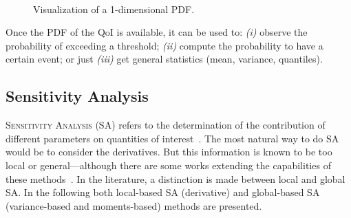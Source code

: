 \begin{figure}[!h]               
\centering
{}
 ~       
\caption{Visualization of a 1-dimensional PDF.}
\label{fig:ex_pdf}
\end{figure}

Once the PDF of the QoI is available, it can be used to: \emph{(i)} observe the probability of exceeding a threshold; \emph{(ii)} compute the probability to have a certain event; or just \emph{(iii)} get general statistics (mean, variance, quantiles).

\subsection{Sensitivity Analysis}\label{sec:sa}
\lettrine{S}{ensitivity Analysis} (SA) refers to the determination of the contribution of different parameters on quantities of interest~\cite{saltelli2007,iooss2016}. The most natural way to do SA would be to consider the derivatives. But this information is known to be too local or general---although there are some works extending the capabilities of these methods~\cite{kucherenko2016}. In the literature, a distinction is made between local and global SA. In the following both local-based SA (derivative) and global-based SA (variance-based and moments-based) methods are presented.

